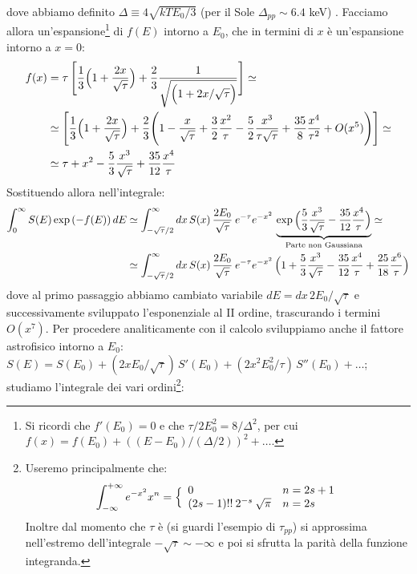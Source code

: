 dove abbiamo definito $\Delta \equiv 4\sqrt{kTE_0/3}$ (per il Sole $\Delta_{pp}\sim 6.4$ keV)%
. Facciamo allora un'espansione\footnote{Si ricordi che $f'(E_0)=0$ e che $\tau/2E_0^2 = 8/\Delta^2$, per cui $f(x) = f(E_0) + ((E-E_0)/(\Delta/2))^2 + \dots$.} di $f(E)$ intorno a $E_0$, che in termini di $x$ è un'espansione intorno a $x=0$:
\begin{align*}
f(x) &= \tau \, \Biggl [ \frac{1}{3} \Bigl ( 1+\frac{2x}{\sqrt{\tau}} \Bigr ) + \frac{2}{3} \frac{1}{\sqrt{\Bigl ( 1+2x/\sqrt{\tau} \Bigr )}} \Biggr ] \simeq\\
&\simeq \Biggl [ \frac{1}{3} \Bigl ( 1+\frac{2x}{\sqrt{\tau}} \Bigr ) + \frac{2}{3} \Biggl ( 1-\frac{x}{\sqrt{\tau}} +\frac{3}{2}\frac{x^2}{\tau} - \frac{5}{2} \frac{x^3}{\tau\sqrt{\tau}}+\frac{35}{8}\frac{x^4}{\tau^2}+ O(x^5) \Biggr )  \Biggr ] \simeq \\
&\simeq \tau  + x^2 - \frac{5}{3} \frac{x^3}{\sqrt{\tau}} + \frac{35}{12}\frac{x^4}{\tau}
\end{align*}
Sostituendo allora nell'integrale:
\begin{displaymath}
\begin{aligned}
\int_0^\infty S(E) \exp{(-f(E))}\,dE &\simeq \int_{-\sqrt{\tau}/2}^\infty dx\, S(x) \, \frac{2E_0}{\sqrt{\tau}} \: e^{-\tau} e^{-x^2} \, \underbrace{\exp{\Bigl ( \frac{5}{3} \frac{x^3}{\sqrt{\tau}} - \frac{35}{12}\frac{x^4}{\tau} \Bigr )}}_\text{Parte non Gaussiana} \simeq \\
&\simeq  \int_{-\sqrt{\tau}/2}^\infty dx\, S(x) \, \frac{2E_0}{\sqrt{\tau}} \: e^{-\tau} e^{-x^2} \, \Bigl ( 1+\frac{5}{3} \frac{x^3}{\sqrt{\tau}} - \frac{35}{12}\frac{x^4}{\tau} + \frac{25}{18} \frac{x^6}{\tau} \Bigr )
\end{aligned}
\end{displaymath}
dove al primo passaggio abbiamo cambiato variabile $dE = dx\,2E_0/\sqrt{\tau}$ e successivamente sviluppato l'esponenziale al II ordine, trascurando i termini $O(x^7)$. Per procedere analiticamente con il calcolo sviluppiamo anche il fattore astrofisico intorno a $E_0$: $S(E) = S(E_0) + (2xE_0/\sqrt{\tau})\,S'(E_0) + (2x^2E_0^2/\tau)\,S''(E_0)+\dots$; studiamo l'integrale dei vari ordini\footnote{Useremo principalmente che:
$$\int_{-\infty}^{+\infty} e^{-x^2} x^n = \Bigl \{ %
\begin{array}{ll}
    0 & n=2s+1 \\
    (2s-1)!!\:2^{-s} \: \sqrt{\pi} & n=2s
\end{array}%
$$%
Inoltre dal momento che $\tau$ è  (si guardi l'esempio di $\tau_{pp}$) si approssima nell'estremo dell'integrale $-\sqrt{\tau}\sim-\infty$ e poi si sfrutta la parità della funzione integranda.}:
